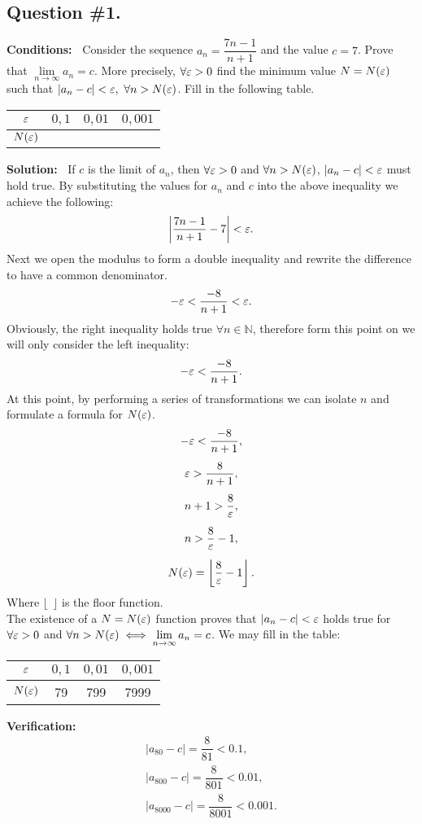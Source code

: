 \subsection*{\center Question \#1.}
{\bf Conditions:~}
Consider the sequence $a_n=\dfrac{7n-1}{n+1}$ and the value $c=7$. 
Prove that $\lim\limits_{n\rightarrow\infty}a_n=c$. 
More precisely, $\forall\varepsilon>0$ find the minimum value $N=N(\varepsilon)$ such that $\left|a_n-c\right|<\varepsilon,\ \forall n>N(\varepsilon)$.
Fill in the following table.
\begin{center}
	\begin{tabular}{|c|c|c|c|}
		\hline
		$\varepsilon$ &  $0{,}1$ & $0{,}01$ & $0{,}001$ \\
		\hline
		$N(\varepsilon)$ & & & \\
		\hline
	\end{tabular}
\end{center}
{\bf Solution:~}
If $c$ is the limit of $a_n$, then $\forall\varepsilon>0$ and $\forall n>N(\varepsilon)$, $\left|a_n-c\right|<\varepsilon$ must hold true.
By substituting the values for $a_n$ and $c$ into the above inequality we achieve the following:
$$\left|\dfrac{7n-1}{n+1}-7\right|<\varepsilon.$$
Next we open the modulus to form a double inequality and rewrite the difference to have a common denominator.
$$-\varepsilon<\dfrac{-8}{n+1}<\varepsilon.$$
Obviously, the right inequality holds true $\forall n \in \mathbb{N}$, therefore form this point on we will only consider the left inequality:
$$-\varepsilon<\dfrac{-8}{n+1}.$$
At this point, by performing a series of transformations we can isolate $n$ and formulate a formula for $N(\varepsilon)$.
$$
\begin{array}{c}
-\varepsilon<\dfrac{-8}{n+1},\\ [12pt]
\varepsilon>\dfrac{8}{n+1},\\ [12pt]
n+1>\dfrac{8}{\varepsilon},\\ [12pt]
n>\dfrac{8}{\varepsilon}-1,\\ [12pt]
N(\varepsilon)=\left\lfloor\dfrac{8}{\varepsilon}-1\right\rfloor.
\end{array}
$$
Where $\lfloor\ \ \rfloor$ {} is the floor function.\\
The existence of a $N=N(\varepsilon)$ function proves that $\left|a_n-c\right|<\varepsilon$ holds true for $\forall\varepsilon>0$ and $\forall n>N(\varepsilon) \iff \lim\limits_{n\rightarrow\infty}a_n=c$. We may fill in the table:
\begin{center}
	\begin{tabular}{|c|c|c|c|}
		\hline
		$\varepsilon$ &  $0{,}1$ & $0{,}01$ & $0{,}001$ \\
		\hline
		$N(\varepsilon)$ & 79 & 799  &  7999 \\
		\hline
	\end{tabular}
\end{center}
{\bf Verification:}
$$
\begin{array}{l}
\left|a_{80}-c\right|=\dfrac{8}{81}<0.1,  \\[12pt]
\left|a_{800}-c\right|=\dfrac{8}{801}<0.01,  \\[12pt]
\left|a_{8000}-c\right|=\dfrac{8}{8001}<0.001.
\end{array}
$$

